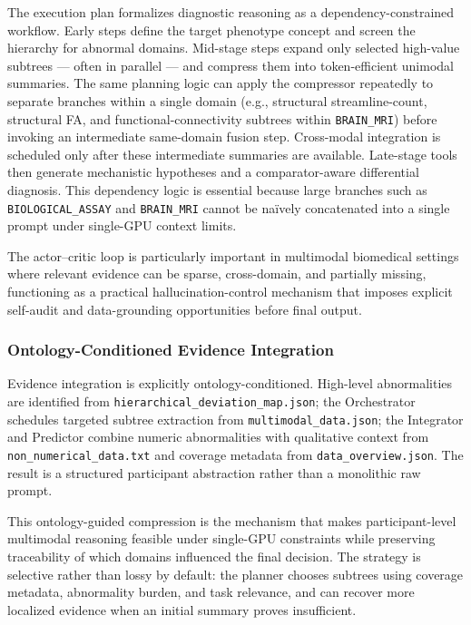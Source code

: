 \documentclass[11pt,a4paper,twoside]{article}
\begin{document}
The execution plan formalizes diagnostic reasoning as a dependency-constrained workflow. Early steps define the target phenotype concept and screen the hierarchy for abnormal domains. Mid-stage steps expand only selected high-value subtrees --- often in parallel --- and compress them into token-efficient unimodal summaries. The same planning logic can apply the compressor repeatedly to separate branches within a single domain (e.g., structural streamline-count, structural FA, and functional-connectivity subtrees within \texttt{BRAIN\_{\allowbreak}MRI}) before invoking an intermediate same-domain fusion step. Cross-modal integration is scheduled only after these intermediate summaries are available. Late-stage tools then generate mechanistic hypotheses and a comparator-aware differential diagnosis. This dependency logic is essential because large branches such as \texttt{BIOLOGICAL\_{\allowbreak}ASSAY} and \texttt{BRAIN\_{\allowbreak}MRI} cannot be naïvely concatenated into a single prompt under single-GPU context limits.

The actor--critic loop is particularly important in multimodal biomedical settings where relevant evidence can be sparse, cross-domain, and partially missing, functioning as a practical hallucination-control mechanism that imposes explicit self-audit and data-grounding opportunities before final output.

\subsubsection{Ontology-Conditioned Evidence Integration}
Evidence integration is explicitly ontology-conditioned. High-level abnormalities are identified from \texttt{hierarchical\_{\allowbreak}deviation\_{\allowbreak}map.{\allowbreak}json}; the Orchestrator schedules targeted subtree extraction from \texttt{multimodal\_{\allowbreak}data.{\allowbreak}json}; the Integrator and Predictor combine numeric abnormalities with qualitative context from \texttt{non\_{\allowbreak}numerical\_{\allowbreak}data.{\allowbreak}txt} and coverage metadata from \texttt{data\_{\allowbreak}overview.{\allowbreak}json}. The result is a structured participant abstraction rather than a monolithic raw prompt.

This ontology-guided compression is the mechanism that makes participant-level multimodal reasoning feasible under single-GPU constraints while preserving traceability of which domains influenced the final decision. The strategy is selective rather than lossy by default: the planner chooses subtrees using coverage metadata, abnormality burden, and task relevance, and can recover more localized evidence when an initial summary proves insufficient.
\end{document}
